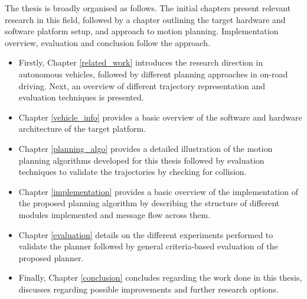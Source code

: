 The thesis is broadly organised as follows. The initial chapters present relevant research in this field, followed by a chapter outlining the target hardware and software platform setup, and approach to motion planning. Implementation overview, evaluation and conclusion follow the approach.
\begin{itemize}
	\item Firstly, Chapter \ref{related_work} introduces the research direction in autonomous vehicles, followed by different planning approaches in on-road driving. Next, an overview of different trajectory representation and evaluation techniques is presented.
	\item Chapter \ref{vehicle_info} provides a basic overview of the software and hardware architecture of the target platform.
	\item Chapter \ref{planning_algo} provides a detailed illustration of the motion planning algorithms developed for this thesis followed by evaluation techniques to validate the trajectories by checking for collision.
	\item Chapter \ref{implementation} provides a basic overview of the implementation of the proposed planning algorithm by describing the structure of different modules implemented and message flow across them.
	\item Chapter \ref{evaluation} details on the different experiments performed to validate the planner followed by general criteria-based evaluation of the proposed planner.
	\item Finally, Chapter \ref{conclusion} concludes regarding the work done in this thesis, discusses regarding possible improvements and further research options.
	
	
	
\end{itemize}












